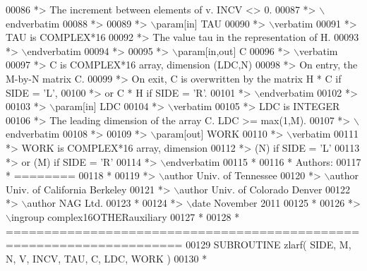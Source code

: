 \begin{DoxyCode}
00086 \textcolor{comment}{*>          The increment between elements of v. INCV <> 0.}
00087 \textcolor{comment}{*> \(\backslash\)endverbatim}
00088 \textcolor{comment}{*>}
00089 \textcolor{comment}{*> \(\backslash\)param[in] TAU}
00090 \textcolor{comment}{*> \(\backslash\)verbatim}
00091 \textcolor{comment}{*>          TAU is COMPLEX*16}
00092 \textcolor{comment}{*>          The value tau in the representation of H.}
00093 \textcolor{comment}{*> \(\backslash\)endverbatim}
00094 \textcolor{comment}{*>}
00095 \textcolor{comment}{*> \(\backslash\)param[in,out] C}
00096 \textcolor{comment}{*> \(\backslash\)verbatim}
00097 \textcolor{comment}{*>          C is COMPLEX*16 array, dimension (LDC,N)}
00098 \textcolor{comment}{*>          On entry, the M-by-N matrix C.}
00099 \textcolor{comment}{*>          On exit, C is overwritten by the matrix H * C if SIDE = 'L',}
00100 \textcolor{comment}{*>          or C * H if SIDE = 'R'.}
00101 \textcolor{comment}{*> \(\backslash\)endverbatim}
00102 \textcolor{comment}{*>}
00103 \textcolor{comment}{*> \(\backslash\)param[in] LDC}
00104 \textcolor{comment}{*> \(\backslash\)verbatim}
00105 \textcolor{comment}{*>          LDC is INTEGER}
00106 \textcolor{comment}{*>          The leading dimension of the array C. LDC >= max(1,M).}
00107 \textcolor{comment}{*> \(\backslash\)endverbatim}
00108 \textcolor{comment}{*>}
00109 \textcolor{comment}{*> \(\backslash\)param[out] WORK}
00110 \textcolor{comment}{*> \(\backslash\)verbatim}
00111 \textcolor{comment}{*>          WORK is COMPLEX*16 array, dimension}
00112 \textcolor{comment}{*>                         (N) if SIDE = 'L'}
00113 \textcolor{comment}{*>                      or (M) if SIDE = 'R'}
00114 \textcolor{comment}{*> \(\backslash\)endverbatim}
00115 \textcolor{comment}{*}
00116 \textcolor{comment}{*  Authors:}
00117 \textcolor{comment}{*  ========}
00118 \textcolor{comment}{*}
00119 \textcolor{comment}{*> \(\backslash\)author Univ. of Tennessee }
00120 \textcolor{comment}{*> \(\backslash\)author Univ. of California Berkeley }
00121 \textcolor{comment}{*> \(\backslash\)author Univ. of Colorado Denver }
00122 \textcolor{comment}{*> \(\backslash\)author NAG Ltd. }
00123 \textcolor{comment}{*}
00124 \textcolor{comment}{*> \(\backslash\)date November 2011}
00125 \textcolor{comment}{*}
00126 \textcolor{comment}{*> \(\backslash\)ingroup complex16OTHERauxiliary}
00127 \textcolor{comment}{*}
00128 \textcolor{comment}{*  =====================================================================}
00129 \textcolor{keyword}{      SUBROUTINE }zlarf( SIDE, M, N, V, INCV, TAU, C, LDC, WORK )
00130 \textcolor{comment}{*}

\end{DoxyCode}
